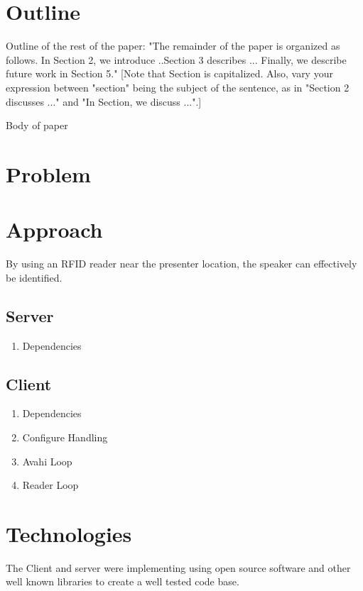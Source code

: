 \documentclass{article}
\begin{document}
\section{Outline}
 
Outline of the rest of the paper: "The remainder of the paper is organized as follows. In Section 2, we introduce ..Section 3 describes ... Finally, we describe future work in Section 5." [Note that Section is capitalized. Also, vary your expression between "section" being the subject of the sentence, as in "Section 2 discusses ..." and "In Section, we discuss ...".] 

Body of paper 
\section{Problem}

\section{Approach}
	By using an RFID reader near the presenter location, the speaker can effectively be identified. 
	\subsection{Server}
	
	\begin{enumerate}
	
	\item	Dependencies
	\end{enumerate}
	
	\subsection{Client}
	
	\begin{enumerate}
	
	\item	Dependencies
	
		
	\item	Configure Handling
		
	\item	Avahi Loop
		
	\item	Reader Loop
	
	\end{enumerate}


\section{Technologies}
The Client and server were implementing using open source software and other well known libraries to create a well tested code base.
\end{document}
